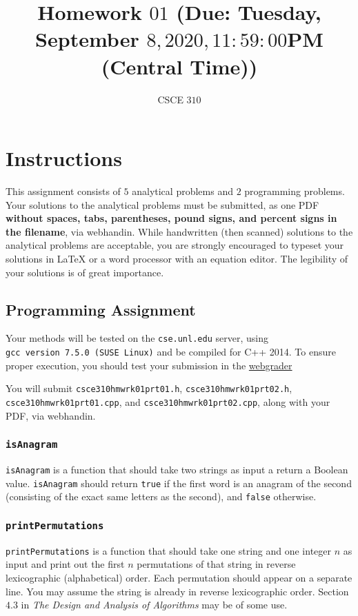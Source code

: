 \documentclass[addpoints,letter,11pt]{exam}
\title{Homework $01$ (Due: Tuesday, September $8, 2020, 11:59:00$PM (Central Time))}
\author{CSCE $310$}
\date{}
\begin{document}
\maketitle

\section*{Instructions}
This assignment consists of $5$ analytical problems and $2$ programming problems. Your solutions to the analytical problems must be submitted, as one PDF \textbf{without spaces, tabs, parentheses, pound signs, and percent signs in the filename}, via webhandin. While handwritten (then scanned) solutions to the analytical problems are acceptable, you are strongly encouraged to typeset your solutions in \LaTeX{} or a word processor with an equation editor. The legibility of your solutions is of great importance.

\subsection*{Programming Assignment}
Your methods will be tested on the \verb+cse.unl.edu+ server, using\\
\verb!gcc version 7.5.0 (SUSE Linux)! and be compiled for C++ 2014. To ensure proper execution, you should test your submission in the \href{http://cse.unl.edu/~cse310/grade}{\color{unlred}webgrader}

You will submit \verb+csce310hmwrk01prt01.h+, \verb+csce310hmwrk01prt02.h+, \verb+csce310hmwrk01prt01.cpp+,  and \verb+csce310hmwrk01prt02.cpp+, along with your PDF, via webhandin.

\subsubsection*{\texttt{isAnagram}}
\verb+isAnagram+ is a function that should take two strings as input a return a Boolean value. \verb+isAnagram+ should return \verb+true+ if the first word is an anagram of the second (consisting of the exact same letters as the second), and \verb+false+ otherwise.

\subsubsection*{\texttt{printPermutations}}
\verb+printPermutations+ is a function that should take one string and one integer $n$ as input and print out the first $n$ permutations of that string in reverse lexicographic (alphabetical) order. Each permutation should appear on a separate line. You may assume the string is already in reverse lexicographic order. Section $4.3$ in \emph{The Design and Analysis of Algorithms} may be of some use.
\end{document}
